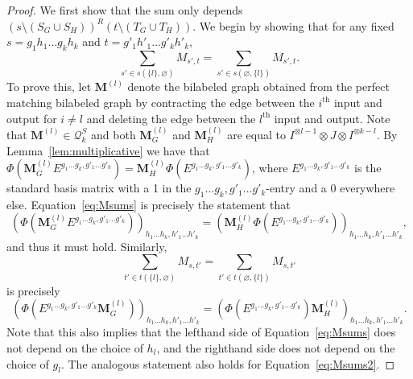\documentclass[11pt,a4paper]{article}
\theoremstyle{plain}
\theoremstyle{remark}
\theoremstyle{definition}
\begin{document}
\begin{proof}
    We first show that the sum only depends $(s\setminus (S_G \cup S_H))^R(t\setminus (T_G \cup T_H))$. We begin by showing that for any fixed $s = g_1h_1\ldots g_kh_k$ and $t = g'_1h'_1\ldots g'_kh'_k$,
    \begin{equation}\label{eq:Msums}
        \sum_{s' \in s(\{l\}, \varnothing)} M_{s',t} = \sum_{s' \in s(\varnothing,\{l\})} M_{s',t}.
    \end{equation}
    To prove this, let $\boldsymbol{M}^{(l)}$ denote the bilabeled graph obtained from the perfect matching bilabeled graph by contracting the edge between the $i^\text{th}$ input and output for $i \ne l$ and deleting the edge between the $l^\text{th}$ input and output. Note that $\boldsymbol{M}^{(l)} \in \mathcal{Q}_k^S$ and both $\boldsymbol{M}^{(l)}_G$ and $\boldsymbol{M}^{(l)}_H$ are equal to $I^{\otimes l-1} \otimes J \otimes I^{\otimes k-l}$. By Lemma~\ref{lem:multiplicative} we have that $\Phi(\boldsymbol{M}^{(l)}_G E^{g_1\ldots g_k, g'_{1}\ldots g'_{k}}) = \boldsymbol{M}^{(l)}_H\Phi(E^{g_1\ldots g_k, g'_{1}\ldots g'_{k}})$, where $E^{g_1\ldots g_k, g'_{1}\ldots g'_{k}}$ is the standard basis matrix with a 1 in the $g_1\ldots g_k, g'_{1}\ldots g'_{k}$-entry and a 0 everywhere else. Equation~\eqref{eq:Msums} is precisely the statement that
\[\left(\Phi(\boldsymbol{M}^{(l)}_GE^{g_1\ldots g_k, g'_{1}\ldots g'_{k}})\right)_{h_1 \ldots h_k,h'_1 \ldots h'_{k}} = \left(\boldsymbol{M}^{(l)}_H\Phi(E^{g_1\ldots g_k, g'_{1}\ldots g'_{k}})\right)_{h_1 \ldots h_k,h'_1 \ldots h'_{k}},\]
and thus it must hold. Similarly,
\begin{equation}\label{eq:Msums2}
    \sum_{t' \in t(\{l\}, \varnothing)} M_{s,t'} = \sum_{t' \in t(\varnothing,\{l\})} M_{s,t'}
\end{equation}
is precisely 
\[\left(\Phi(E^{g_1\ldots g_k, g'_{1}\ldots g'_{k}}\boldsymbol{M}^{(l)}_G)\right)_{h_1 \ldots h_k,h'_1 \ldots h'_{k}} = \left(\Phi(E^{g_1\ldots g_k, g'_{1}\ldots g'_{k}})\boldsymbol{M}^{(l)}_H\right)_{h_1 \ldots h_k,h'_1 \ldots h'_{k}}.\]
Note that this also implies that the lefthand side of Equation~\eqref{eq:Msums} does not depend on the choice of $h_l$, and the righthand side does not depend on the choice of $g_l$. The analogous statement also holds for Equation~\eqref{eq:Msums2}.


\end{proof}
\end{document}
